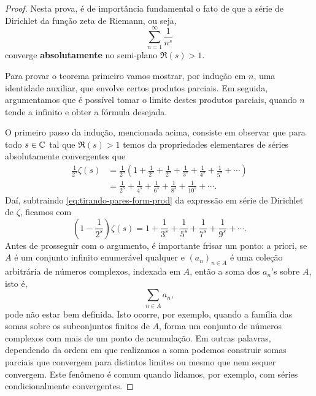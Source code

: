     \begin{proof}
        Nesta prova, é de importância fundamental o fato de que a
        série de Dirichlet da função zeta de Riemann, ou seja,
        \[
        \sum_{n=1}^{\infty} \frac{1}{n^s}
        \]
        converge {\bf absolutamente} no semi-plano $\Re(s) > 1$.
        
        Para provar o teorema primeiro vamos mostrar, por indução em $n$, uma identidade auxiliar, que envolve certos produtos parciais. Em seguida, argumentamos que é possível 
        tomar o limite destes produtos parciais, quando $n$ tende a infinito e obter a fórmula desejada. 
        
        O primeiro passo da indução, mencionada acima, consiste em observar que para todo $s\in\mathbb{C}$ tal que $\Re(s)>1$ temos
        da propriedades elementares de séries absolutamente convergentes que
        \begin{align}
        \label{eq:tirando-pares-form-prod}
            \frac{1}{2^s}\zeta(s) 
            &= \frac{1}{2^s}\left(
            1 + \frac{1}{2^s} + \frac{1}{2^s} 
            + \frac{1}{3^s} + \frac{1}{4^s}
            + \frac{1}{5^s} + \cdots
            \right)
            \nonumber\\
            &= \frac{1}{2^s} + \frac{1}{4^s} + \frac{1}{6^s}
            + \frac{1}{8^s} + \frac{1}{10^s} + \cdots.
        \end{align}
        Daí, subtraindo \eqref{eq:tirando-pares-form-prod} da expressão
        em série de Dirichlet de $\zeta$, ficamos com
        \begin{equation}
        \label{eq:zeta-sem-pares}
            \left( 1 - \frac{1}{2^s} \right)\zeta(s) 
            = 1 + \frac{1}{3^s} + \frac{1}{5^s} 
            + \frac{1}{7^s} + \frac{1}{9^s} + \cdots.
        \end{equation}
        Antes de prosseguir com o argumento, é importante frisar um
        ponto: a priori, se $A$ é um conjunto infinito enumerável qualquer e $(a_n)_{n\in A}$ é uma coleção arbitrária de números complexos, indexada em $A$, então a soma dos $a_n$'s sobre $A$, isto é,
        \[
        \sum_{n\in A} a_n,
        \]
        pode não estar bem definida. 
        Isto ocorre, por exemplo, quando a família das 
        somas sobre os subconjuntos finitos de $A$, 
        forma um conjunto de números complexos 
        com mais de um ponto de acumulação. 
        Em outras palavras, dependendo da ordem em que realizamos a
        soma podemos construir somas parciais que convergem para 
        distintos limites ou mesmo que nem sequer convergem.
        Este fenômeno é comum quando lidamos, por exemplo, 
        com séries condicionalmente convergentes.
        

\end{proof}
